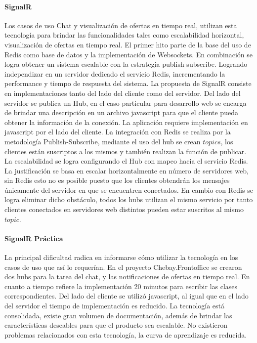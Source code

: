 \documentclass[journal]{IEEEtran}
\begin{document}
\paragraph{SignalR}
Los casos de uso Chat y visualización de ofertas en tiempo real, utilizan esta tecnología para brindar las funcionalidades tales como escalabilidad horizontal, visualización de ofertas en tiempo real. El primer hito parte de la base del uso de Redis como base de datos y la implementación de Websockets. En combinación se logra obtener un sistema escalable con la estrategia publish-subscribe. Logrando independizar en un servidor dedicado el servicio Redis, incrementando la performance y tiempo de respuesta del sistema.
La propuesta de SignalR consiste en implementaciones tanto del lado del cliente como del servidor. Del lado del servidor se publica un Hub, en el caso particular para desarrollo web se encarga de brindar una descripción en un archivo javascript para que el cliente pueda obtener la información de la conexión. La aplicación requiere implementación en javascript por el lado del cliente. La integración con Redis se realiza por la metodología Publish-Subscribe, mediante el uso del hub se crean $topics$, los clientes están suscriptos a los mismos y también realizan la función de publicar.
La escalabilidad se logra configurando el Hub con mapeo hacia el servicio Redis. La justificación se basa en escalar horizontalmente en número de servidores web, sin Redis esto no es posible puesto que los clientes obtendrán los mensajes únicamente del servidor en que se encuentren conectados. En cambio con Redis se logra eliminar dicho obstáculo, todos los hubs utilizan el mismo servicio por tanto clientes conectados en servidores web distintos pueden estar suscritos al mismo $topic$.

\paragraph{SignalR Práctica}
La principal dificultad radica en informarse cómo utilizar la tecnología en los casos de uso que así lo requerían. En el proyecto Chebay.Frontoffice se crearon dos hubs para la tarea del chat, y las notificaciones de ofertas en tiempo real. En cuanto a tiempo refiere la implementación 20 minutos para escribir las clases correspondientes.
Del lado del cliente se utilizó javascript, al igual que en el lado del servidor el tiempo de implementación es reducido.
La tecnología está consolidada, existe gran volumen de documentación, además de brindar las características deseables para que el producto sea escalable.
No existieron problemas relacionados con esta tecnología, la curva de aprendizaje es reducida.
\end{document}
